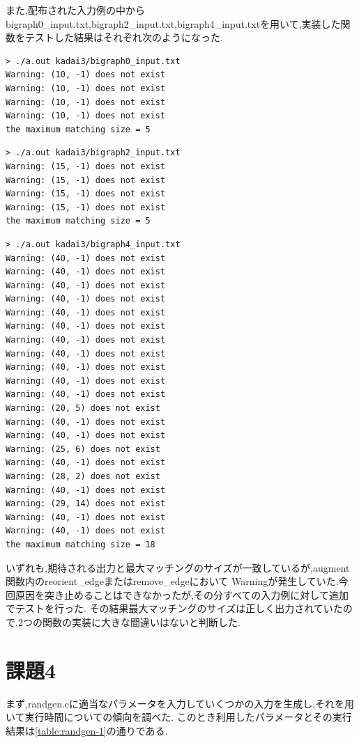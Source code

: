 \documentclass[autodetect-engine, dvi=dvipdfmx, 10pt, a4paper, ja=standard]{bxjsarticle}
\begin{document}
また,配布された入力例の中からbigraph0\_input.txt,bigraph2\_input.txt,bigraph4\_input.txtを用いて,実装した関数をテストした結果はそれぞれ次のようになった.

\begin{verbatim}
> ./a.out kadai3/bigraph0_input.txt
Warning: (10, -1) does not exist
Warning: (10, -1) does not exist
Warning: (10, -1) does not exist
Warning: (10, -1) does not exist
the maximum matching size = 5
\end{verbatim}

\begin{verbatim}
> ./a.out kadai3/bigraph2_input.txt
Warning: (15, -1) does not exist
Warning: (15, -1) does not exist
Warning: (15, -1) does not exist
Warning: (15, -1) does not exist
the maximum matching size = 5
\end{verbatim}

\begin{verbatim}
> ./a.out kadai3/bigraph4_input.txt
Warning: (40, -1) does not exist
Warning: (40, -1) does not exist
Warning: (40, -1) does not exist
Warning: (40, -1) does not exist
Warning: (40, -1) does not exist
Warning: (40, -1) does not exist
Warning: (40, -1) does not exist
Warning: (40, -1) does not exist
Warning: (40, -1) does not exist
Warning: (40, -1) does not exist
Warning: (40, -1) does not exist
Warning: (20, 5) does not exist
Warning: (40, -1) does not exist
Warning: (40, -1) does not exist
Warning: (25, 6) does not exist
Warning: (40, -1) does not exist
Warning: (28, 2) does not exist
Warning: (40, -1) does not exist
Warning: (29, 14) does not exist
Warning: (40, -1) does not exist
Warning: (40, -1) does not exist
the maximum matching size = 18
\end{verbatim}


いずれも,期待される出力と最大マッチングのサイズが一致しているが,augment関数内のreorient\_edgeまたはremove\_edgeにおいて
Warningが発生していた.今回原因を突き止めることはできなかったが,その分すべての入力例に対して追加でテストを行った.
その結果最大マッチングのサイズは正しく出力されていたので,2つの関数の実装に大きな間違いはないと判断した.

\section{課題4}
まず,randgen.cに適当なパラメータを入力していくつかの入力を生成し,それを用いて実行時間についての傾向を調べた.
このとき利用したパラメータとその実行結果は\ref{table:randgen-1}の通りである.
\end{document}
